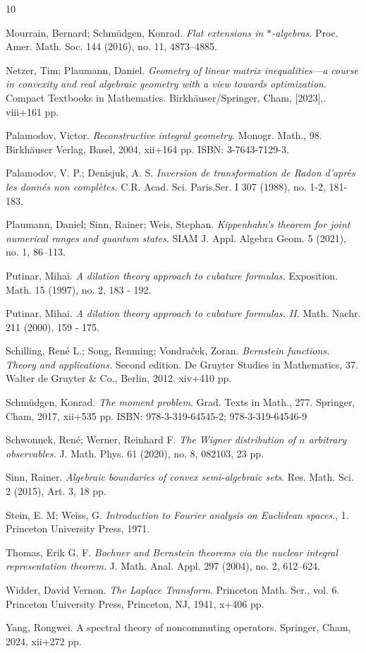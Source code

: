 \documentclass[11pt,reqno]{amsart}
\theoremstyle{plain}
\theoremstyle{definition}
\numberwithin{equation}{section}
\begin{document}
\begin{thebibliography}{10}
		
		  Mourrain, Bernard; Schmüdgen, Konrad. {\em Flat extensions in $*$-algebras}. Proc. Amer. Math. Soc. 144 (2016), no. 11, 4873–4885.
		
		Netzer, Tim; Plaumann, Daniel. {\em Geometry of linear matrix inequalities—a course in convexity and real algebraic geometry with a view towards optimization}. Compact Textbooks in Mathematics. Birkh\"auser/Springer, Cham, [2023],. viii+161 pp. 
		
		 Palamodov, Victor. {\em Reconstructive integral geometry}. Monogr. Math., 98.
Birkhäuser Verlag, Basel, 2004, xii+164 pp.
ISBN: 3-7643-7129-3.

        Palamodov, V. P.; Denisjuk, A. S. {\em Inversion de transformation de Radon d'apr\`{e}s les donn\'{e}s non compl\`{e}tes.}
		C.R. Acad. Sci. Paris.Ser. I 307 (1988), no. 1-2, 181-183.
		
		Plaumann, Daniel; Sinn, Rainer; Weis, Stephan. {\em Kippenhahn's theorem for joint numerical ranges and quantum states}. SIAM J. Appl. Algebra Geom. 5 (2021), no. 1, 86--113.
		
		
	 	Putinar, Mihai. {\em A dilation theory approach to cubature formulas.} Exposition. Math. 15 (1997), no. 2, 183 - 192.
	
		Putinar, Mihai. {\em A dilation theory approach to cubature formulas. II}. Math. Nachr. 211 (2000), 159 - 175. 

Schilling, Ren\'e L.; Song, Renming; Vondra\v{c}ek, Zoran. {\em Bernstein functions. Theory and applications.} Second edition. De Gruyter Studies in Mathematics, 37. Walter de Gruyter \& Co., Berlin, 2012. xiv+410 pp. 

 
        
		 Schmüdgen, Konrad. {\em The moment problem}.
		Grad. Texts in Math., 277.
		Springer, Cham, 2017, xii+535 pp.
		ISBN: 978-3-319-64545-2; 978-3-319-64546-9
		
		Schwonnek, Ren\'e; Werner, Reinhard F. {\it The Wigner distribution of $n$ arbitrary observables.} J. Math. Phys. 61 (2020), no. 8, 082103, 23 pp.
		
		
		Sinn, Rainer. {\em Algebraic boundaries of convex semi-algebraic sets}. Res. Math. Sci. 2 (2015), Art. 3, 18 pp.
		
        Stein, E. M;  Weiss, G. {\em Introduction to Fourier analysis on Euclidean spaces}., 1. Princeton University Press, 1971.

         Thomas, Erik G. F. {\em Bochner and Bernstein theorems via the nuclear integral representation theorem}. J. Math. Anal. Appl. 297 (2004), no. 2, 612–624. 
		
		 Widder, David Vernon. {\em The Laplace Transform}.
		Princeton Math. Ser., vol. 6.
		Princeton University Press, Princeton, NJ, 1941, x+406 pp.
		
		Yang, Rongwei. A spectral theory of noncommuting operators. Springer, Cham, 2024, xii+272 pp.
		
		
	\end{thebibliography}
	
\end{document}

